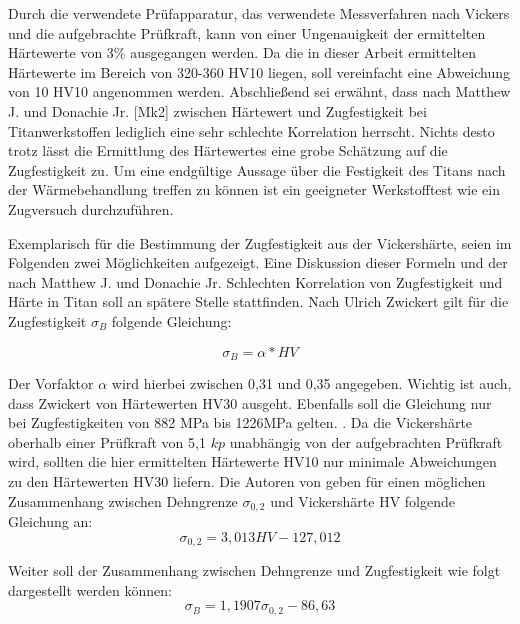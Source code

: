 \documentclass[a4paper, 11pt]{tubsreprt}
\begin{document}
Durch die verwendete Prüfapparatur, das verwendete Messverfahren nach Vickers und die aufgebrachte Prüfkraft, kann von einer Ungenauigkeit der ermittelten Härtewerte von 3\% ausgegangen werden. Da die in dieser Arbeit ermittelten Härtewerte im Bereich von 320-360 HV10 liegen, soll vereinfacht eine Abweichung von 10 HV10 angenommen werden.
Abschließend sei erwähnt, dass nach Matthew J. und Donachie Jr. [Mk2] zwischen Härtewert und Zugfestigkeit bei Titanwerkstoffen lediglich eine sehr schlechte Korrelation herrscht. Nichts desto trotz lässt die Ermittlung des Härtewertes eine grobe Schätzung auf die Zugfestigkeit zu. Um eine endgültige Aussage über die Festigkeit des Titans nach der Wärmebehandlung treffen zu können ist ein geeigneter Werkstofftest wie ein Zugversuch durchzuführen.


Exemplarisch für die Bestimmung der Zugfestigkeit aus der Vickershärte, seien im Folgenden zwei Möglichkeiten aufgezeigt. Eine Diskussion dieser Formeln und der nach Matthew J. und Donachie Jr. Schlechten Korrelation von Zugfestigkeit und Härte in Titan soll an spätere Stelle stattfinden.
Nach Ulrich Zwickert gilt für die Zugfestigkeit  $\sigma_{B}$  folgende Gleichung:

\begin{equation}
\sigma_{B}=\alpha*HV
\label{Zugfestigkeit}
\end{equation}

Der Vorfaktor $\alpha$ wird hierbei zwischen 0,31 und 0,35 angegeben. Wichtig ist auch, dass Zwickert von Härtewerten HV30 ausgeht. Ebenfalls soll die Gleichung nur bei Zugfestigkeiten von 882 MPa bis 1226MPa gelten. \cite[S. 202f.]{Zwicker1974}. Da die Vickershärte oberhalb einer Prüfkraft von 5,1 $kp$ unabhängig von der aufgebrachten Prüfkraft wird, sollten die hier ermittelten Härtewerte HV10 nur minimale Abweichungen zu den Härtewerten HV30 liefern. 
Die Autoren von \cite{Shi2013} geben für einen möglichen Zusammenhang zwischen Dehngrenze $\sigma_{0,2}$ und Vickershärte HV folgende Gleichung an:
\begin{equation}
\sigma_{0,2} = 3,013 HV - 127,012
\label{Formel zusammenhang dehngrenze vickershärte}
\end{equation}

Weiter soll der Zusammenhang zwischen Dehngrenze und Zugfestigkeit wie folgt dargestellt werden können: 
\begin{equation}
\sigma_{B} = 1,1907\sigma_{0,2} - 86,63
\label{Formel zusammenhang dehngrenze und Zugfestigkeit}
\end{equation}
\end{document}
